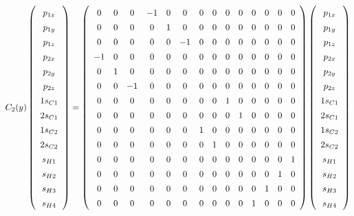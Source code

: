 \documentclass[9pt]{report}
\begin{document}
\scriptsize
\begin{equation}
C_{2}(y)
\renewcommand{\arraystretch}{1.4}
\left(\begin{array}{c} p_{1x}  \\  p_{1y}  \\  p_{1z}  \\  p_{2x}  \\ p_{2y} \\  p_{2z}  \\  1s_{C1}  \\  2s_{C1}  \\  1s_{C2}  \\  2s_{C2}  \\  s_{H1}  \\  s_{H2}  \\  s_{H3}  \\  s_{H4}   \\\end{array}\right)
=
\left(\begin{array}{cccccccccccccc}
0 & 0 & 0 & -1 & 0 & 0 & 0 & 0 & 0 & 0 & 0 & 0 & 0 & 0
\\
0 & 0 & 0 & 0 & 1 & 0 & 0 & 0 & 0 & 0 & 0 & 0 & 0 & 0
\\
0 & 0 & 0 & 0 & 0 & -1 & 0 & 0 & 0 & 0 & 0 & 0 & 0 & 0
\\
-1 & 0 & 0 & 0 & 0 & 0 & 0 & 0 & 0 & 0 & 0 & 0 & 0 & 0
\\
0 & 1 & 0 & 0 & 0 & 0 & 0 & 0 & 0 & 0 & 0 & 0 & 0 & 0
\\
0 & 0 & -1 & 0 & 0 & 0 & 0 & 0 & 0 & 0 & 0 & 0 & 0 & 0
\\
0 & 0 & 0 & 0 & 0 & 0 & 0 & 0 & 1 & 0 & 0 & 0 & 0 & 0
\\
0 & 0 & 0 & 0 & 0 & 0 & 0 & 0 & 0 & 1 & 0 & 0 & 0 & 0
\\
0 & 0 & 0 & 0 & 0 & 0 & 1 & 0 & 0 & 0 & 0 & 0 & 0 & 0
\\
0 & 0 & 0 & 0 & 0 & 0 & 0 & 1 & 0 & 0 & 0 & 0 & 0 & 0
\\
0 & 0 & 0 & 0 & 0 & 0 & 0 & 0 & 0 & 0 & 0 & 0 & 0 & 1
\\
0 & 0 & 0 & 0 & 0 & 0 & 0 & 0 & 0 & 0 & 0 & 0 & 1 & 0
\\
0 & 0 & 0 & 0 & 0 & 0 & 0 & 0 & 0 & 0 & 0 & 1 & 0 & 0
\\
0 & 0 & 0 & 0 & 0 & 0 & 0 & 0 & 0 & 0 & 1 & 0 & 0 & 0
\\\end{array}\right)
\left(\begin{array}{c} p_{1x}  \\  p_{1y}  \\  p_{1z}  \\  p_{2x}  \\ p_{2y} \\  p_{2z}  \\  1s_{C1}  \\  2s_{C1}  \\  1s_{C2}  \\  2s_{C2}  \\  s_{H1}  \\  s_{H2}  \\  s_{H3}  \\  s_{H4}   \\\end{array}\right)
\end{equation}
\end{document}
